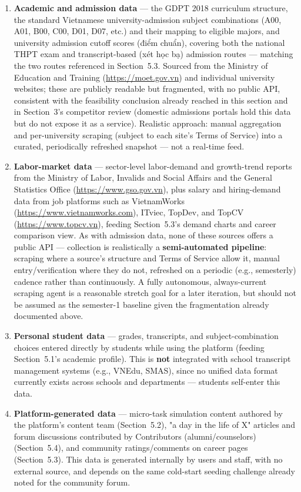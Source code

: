 \documentclass[a4paper]{article}
\begin{document}
\begin{enumerate}
    \item \textbf{Academic and admission data} — the GDPT 2018 curriculum structure, the
    standard Vietnamese university-admission subject combinations (A00, A01, B00, C00, D01, D07,
    etc.) and their mapping to eligible majors, and university admission cutoff scores (điểm
    chuẩn), covering both the national THPT exam and transcript-based (xét học bạ) admission
    routes --- matching the two routes referenced in Section~5.3. Sourced from the Ministry of
    Education and Training (\url{https://moet.gov.vn}) and individual university websites; these
    are publicly readable but fragmented, with no public API, consistent with the feasibility
    conclusion already reached in this section and in Section~3's competitor review (domestic
    admissions portals hold this data but do not expose it as a service). Realistic approach:
    manual aggregation and per-university scraping (subject to each site's Terms of Service)
    into a curated, periodically refreshed snapshot --- not a real-time feed.
    \item \textbf{Labor-market data} — sector-level labor-demand and growth-trend reports from
    the Ministry of Labor, Invalids and Social Affairs and the General Statistics Office
    (\url{https://www.gso.gov.vn}), plus salary and hiring-demand data from job platforms such as
    VietnamWorks (\url{https://www.vietnamworks.com}), ITviec, TopDev, and TopCV
    (\url{https://www.topcv.vn}), feeding Section~5.3's demand charts and career comparison view.
    As with admission data, none of these sources offers a public API --- collection is
    realistically a \textbf{semi-automated pipeline}: scraping where a source's structure and
    Terms of Service allow it, manual entry/verification where they do not, refreshed on a
    periodic (e.g., semesterly) cadence rather than continuously. A fully autonomous,
    always-current scraping agent is a reasonable stretch goal for a later iteration, but should
    not be assumed as the semester-1 baseline given the fragmentation already documented above.
    \item \textbf{Personal student data} — grades, transcripts, and subject-combination choices
    entered directly by students while using the platform (feeding Section~5.1's academic
    profile). This is \textbf{not} integrated with school transcript management systems (e.g.,
    VNEdu, SMAS), since no unified data format currently exists across schools and departments
    --- students self-enter this data.
    \item \textbf{Platform-generated data} — micro-task simulation content authored by the
    platform's content team (Section~5.2), "a day in the life of X" articles and forum
    discussions contributed by Contributors (alumni/counselors) (Section~5.4), and community
    ratings/comments on career pages (Section~5.3). This data is generated internally by users
    and staff, with no external source, and depends on the same cold-start seeding challenge
    already noted for the community forum.
\end{enumerate}
\end{document}
